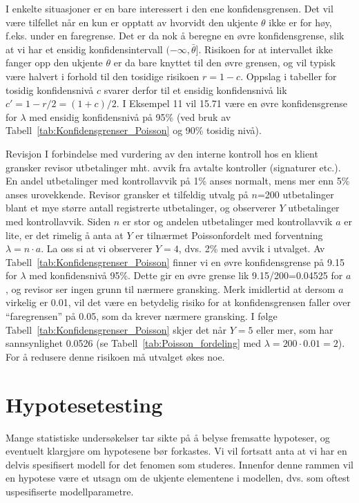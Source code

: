 I enkelte situasjoner er en bare interessert i den ene
konfidensgrensen. Det vil være tilfellet når en kun er opptatt av
hvorvidt den ukjente $\theta$ ikke er for høy, f.eks. under en
faregrense. Det er da nok å beregne en øvre konfidensgrense, slik
at vi har et ensidig konfidensintervall $( - \infty , \bar{\theta}]$.
Risikoen for at intervallet ikke fanger opp den ukjente $\theta$
er da bare knyttet til den øvre grensen, og vil typisk være
halvert i forhold til den tosidige risikoen $r=1-c$. Oppslag i
tabeller for tosidig konfidensnivå $c$ svarer derfor til et
ensidig konfidensnivå lik $c'=1-r/2=(1+c)/2$. I Eksempel 11 vil
15.71 være en øvre konfidensgrense for $\lambda$ med ensidig
konfidensnivå på 95\% (ved bruk av Tabell~\ref{tab:Konfidensgrenser_Poisson} og 90\% tosidig nivå).\\

\begin{eksempel}{Revisjon}
I forbindelse med vurdering av den interne kontroll hos en klient
gransker revisor utbetalinger mht. avvik fra avtalte kontroller
(signaturer etc.). En andel utbetalinger med kontrollavvik på 1\%
anses normalt, mens mer enn 5\% anses urovekkende. Revisor
gransker et tilfeldig utvalg på $n$=200 utbetalinger blant et mye
større antall registrerte utbetalinger, og observerer $Y$
utbetalinger med kontrollavvik. Siden $n$ er stor og andelen
utbetalinger med kontrollavvik $a$ er lite, er det rimelig å anta
at $Y$ er tilnærmet Poissonfordelt med forventning
$\lambda=n\cdot a$. La oss si at vi observerer $Y=4$, dvs. 2\% med
avvik i utvalget. Av Tabell~\ref{tab:Konfidensgrenser_Poisson} finner vi en øvre konfidensgrense
på 9.15 for $\lambda$ med konfidensnivå 95\%. Dette gir en øvre
grense lik 9.15/200=0.04525 for $a$, og revisor ser ingen grunn
til nærmere gransking. Merk imidlertid at dersom $a$ virkelig er
0.01, vil det være en betydelig risiko for at konfidensgrensen
faller over ``faregrensen'' på 0.05, som da krever nærmere
gransking. I følge Tabell~\ref{tab:Konfidensgrenser_Poisson} skjer 
det når $Y=5$ eller mer, som har sannsynlighet 0.0526 
(se Tabell~\ref{tab:Poisson_fordeling} med $\lambda = 200\cdot
0.01 = 2$). For å redusere denne risikoen må utvalget økes noe.
\end{eksempel}

\section{Hypotesetesting}

Mange statistiske undersøkelser tar sikte på å belyse fremsatte
hypoteser, og eventuelt klargjøre om hypotesene bør forkastes. Vi
vil fortsatt anta at vi har en delvis spesifisert modell for det
fenomen som studeres. Innenfor denne rammen vil en hypotese være
et utsagn om de ukjente elementene i modellen, dvs. som oftest
uspesifiserte modellparametre.

